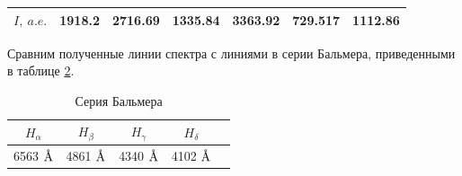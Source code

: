 \documentclass[a4paper, 12pt]{article}
\newcommand{\angstrom}{\textup{\AA}}
\begin{document}
\begin{enumerate}
\begin{table}
\begin{tabular}{|c|c|c|c|c|c|c|}
                $I,\ a.e.$ & 1918.2 & 2716.69 & 1335.84 & 3363.92 & 729.517 & 1112.86 \\
                \hline
		    \end{tabular}
		    \label{table:peaks}
		\end{table}
		Сравним полученные линии спектра с линиями в серии Бальмера, приведенными в таблице \ref{table:balmer}.
		\begin{table}[]
		    \centering
		    \caption{Серия Бальмера}
		    \begin{tabular}{|c|c|c|c|c|}
		        \hline
		        $H_{\alpha}$ & $H_{\beta}$ & $H_{\gamma}$ & $H_{\delta}$\\
		        \hline
		         6563 $\angstrom$ & 4861 $\angstrom$ & 4340 $\angstrom$ & 4102 $\angstrom$\\
		         \hline
		    \end{tabular}
		    \label{table:balmer}
		\end{table}\par
		
\end{enumerate}
\end{document}

